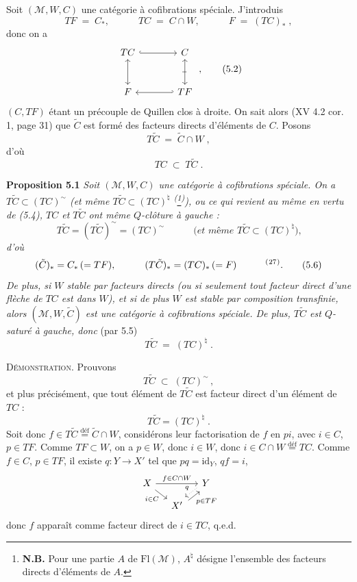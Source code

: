 \documentclass[11pt]{article}
\newcommand{\printedpage}[1]{\marginpar{\footnotesize p.~#1}}
\newcommand{\msp}[1]{\marginpar{\footnotesize [#1]}}
\newcommand{\defeq}{\overset{\text{déf}}{=}}
\newcommand{\fnm}[1]{\textsuperscript{(}\footnotemark[#1]\textsuperscript{)}}
\newcommand{\cl}{^{\sim}}%
\begin{document}
Soit $(\mathcal{M}, W, C)$ une catégorie à cofibrations spéciale. J'introduis
\[
TF \;=\; C_{*}, \qquad\quad TC \;=\; C \cap W, \qquad\quad F \;=\; (TC)_{*} \; ,
\tag*{(5.1)}
\]
donc on a
\[
\begin{tikzcd}[row sep=large, column sep=large]
TC \arrow[r, hook] \arrow[d, leftrightarrow] & C \arrow[d, leftrightarrow, "\shortmid"{marking, sloped}] \\
F & TF \arrow[l, hook']
\end{tikzcd} \; ,
\tag*{(5.2)}
\]
$(C, TF)$ étant un précouple de Quillen clos à droite. On sait alors (XV 4.2 cor. 1, page 31) que $\tilde{C}$ est formé des facteurs directs d'éléments de $C$. Posons
\[
T\tilde{C} \;=\; \tilde{C} \cap W \; ,
\tag*{(5.3)}
\]
d'où
\[
TC \;\subset\; T\tilde{C} \; .
\tag*{(5.4)}
\]

\textbf{Proposition 5.1} \textit{Soit $(\mathcal{M}, W, C)$ une catégorie à cofibrations spéciale. On a $T\tilde{C} \subset (TC)\cl$ (et même $T\tilde{C} \subset (TC)^{\natural}$ \textsuperscript{(}\footnote[26]{\textbf{N.B.} Pour une partie $A$ de $\mathrm{Fl}(\mathcal{M})$, $A^{\natural}$ désigne l'ensemble des facteurs directs d'éléments de $A$.}\textsuperscript{)}), ou ce qui revient au même en vertu de (5.4), $TC$ et $T\tilde{C}$ ont même $Q$-clôture à gauche :}
\[
T\tilde{C} = (T\tilde{C})\cl = (TC)\cl \qquad\quad \textit{(et même } T\tilde{C} \subset (TC)^{\natural}\textit{),}
\tag*{(5.5)}
\]
\printedpage{42}
\textit{d'où}
\[
(\tilde{C})_{*} = C_{*} \, (= TF), \qquad\quad (T\tilde{C})_{*} = (TC)_{*} \, (= F) \qquad\quad \text{\fnm{27}}.
\tag*{(5.6)}
\]
\textit{De plus, si $W$ stable par facteurs directs (ou si seulement tout facteur direct d'une flèche de $TC$ est dans $W$), et si de plus $W$ est stable par composition transfinie, alors $(\mathcal{M}, W, \tilde{C})$ est une catégorie à cofibrations spéciale. De plus, $T\tilde{C}$ est $Q$-saturé à gauche, donc} (par 5.5)
\[
T\tilde{C} \;=\; (TC)^{\natural} \; .
\tag*{(5.7)}
\]

\msp{page 85}

\textsc{Démonstration}. Prouvons
\[
T\tilde{C} \;\subset\; (TC)\cl \, ,
\]
et plus précisément, que tout élément de $T\tilde{C}$ est facteur direct d'un élément de $TC$ :
\[
T\tilde{C} = (TC)^{\natural} \; .
\]
Soit donc $f \in T\tilde{C} \defeq \tilde{C}\cap W$, considérons leur factorisation de $f$ en $pi$, avec $i \in C$, $p \in TF$. Comme $TF \subset W$, on a $p \in W$, donc $i \in W$, donc $i \in C \cap W \defeq TC$. Comme $f \in C$, $p \in TF$, il existe $q : Y \longrightarrow X'$ tel que $pq = \mathrm{id}_Y$, $qf = i$,
\[
\begin{tikzcd}[column sep=small, row sep=small]
X \arrow[rr, "f\in C\cap W"] \arrow[dr, "i\in C"'] & & Y \arrow[dl, dotted, shift right, "q"'] \\
& X' \arrow[ur, shift right, "p\in TF"'] &
\end{tikzcd}
\]
donc $f$ apparaît comme facteur direct de $i \in TC$, q.e.d.
\end{document}
